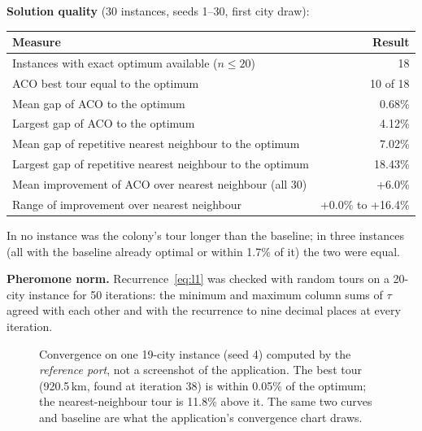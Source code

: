 \documentclass[11pt,a4paper]{article}
\begin{document}
\textbf{Solution quality} (30 instances, seeds 1--30, first city draw):
\begin{center}
\begin{tabular}{@{}lr@{}}
\toprule
\textbf{Measure} & \textbf{Result} \\
\midrule
Instances with exact optimum available ($n\le20$) & 18 \\
ACO best tour equal to the optimum & 10 of 18 \\
Mean gap of ACO to the optimum & 0.68\% \\
Largest gap of ACO to the optimum & 4.12\% \\
Mean gap of repetitive nearest neighbour to the optimum & 7.02\% \\
Largest gap of repetitive nearest neighbour to the optimum & 18.43\% \\
Mean improvement of ACO over nearest neighbour (all 30) & +6.0\% \\
Range of improvement over nearest neighbour & +0.0\% to +16.4\% \\
\bottomrule
\end{tabular}
\end{center}
In no instance was the colony's tour longer than the baseline; in three instances (all with the baseline
already optimal or within 1.7\% of it) the two were equal.

\textbf{Pheromone norm.} Recurrence~\eqref{eq:l1} was checked with random tours on a 20-city instance for 50
iterations: the minimum and maximum column sums of $\tau$ agreed with each other and with the recurrence to
nine decimal places at every iteration.

\begin{figure}[htbp]\centering
{}
\caption{Convergence on one 19-city instance (seed 4) computed by the \emph{reference port}, not a
screenshot of the application. The best tour (920.5\,km, found at iteration 38) is within 0.05\% of the
optimum; the nearest-neighbour tour is 11.8\% above it. The same two curves and baseline are what the
application's convergence chart draws.}
\label{fig:port}
\end{figure}
\end{document}
